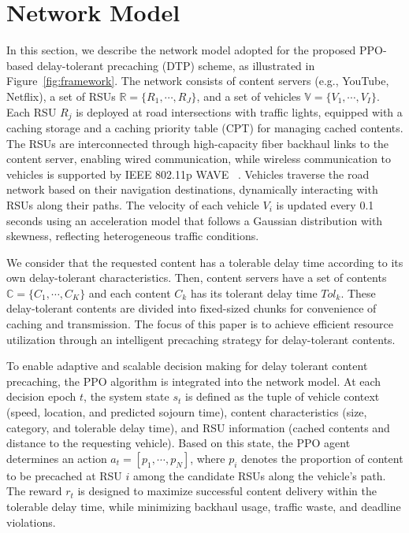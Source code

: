 \section{Network Model} \label{sec.nm}
In this section, we describe the network model adopted for the proposed PPO-based delay-tolerant precaching (DTP) scheme, as illustrated in Figure~\ref{fig:framework}. 
The network consists of content servers (e.g., YouTube, Netflix), a set of RSUs $\mathbb{R}=\{R_{1},\cdots,R_{J}\}$, and a set of vehicles $\mathbb{V}=\{V_{1},\cdots,V_{I}\}$. 
Each RSU $R_{j}$ is deployed at road intersections with traffic lights, equipped with a caching storage and a caching priority table (CPT) for managing cached contents. 
The RSUs are interconnected through high-capacity fiber backhaul links to the content server, enabling wired communication, while wireless communication to vehicles is supported by IEEE 802.11p WAVE ~\cite{WAVE}. 
Vehicles traverse the road network based on their navigation destinations, dynamically interacting with RSUs along their paths. The velocity of each vehicle $V_{i}$ is updated every 0.1 seconds using an acceleration model that follows a Gaussian distribution with skewness, reflecting heterogeneous traffic conditions.  

We consider that the requested content has a tolerable delay time according to its own delay-tolerant characteristics. Then, content servers have a set of contents $\mathbb{C}=\{C_{1},\cdots,C_{K}\}$ and each content $C_{k}$ has its tolerant delay time $Tol_{k}$. These delay-tolerant contents are divided into fixed-sized chunks for convenience of caching and transmission. The focus of this paper is to achieve efficient resource utilization through an intelligent precaching strategy for delay-tolerant contents. 

To enable adaptive and scalable decision making for delay tolerant content precaching, the PPO algorithm is integrated into the network model. At each decision epoch $t$, the system state $s_t$ is defined as the tuple of vehicle context (speed, location, and predicted sojourn time), content characteristics (size, category, and tolerable delay time), and RSU information (cached contents and distance to the requesting vehicle). Based on this state, the PPO agent determines an action $a_t = [p_1, \cdots, p_N]$, where $p_i$ denotes the proportion of content to be precached at RSU $i$ among the candidate RSUs along the vehicle’s path. The reward $r_t$ is designed to maximize successful content delivery within the tolerable delay time, while minimizing backhaul usage, traffic waste, and deadline violations.  

